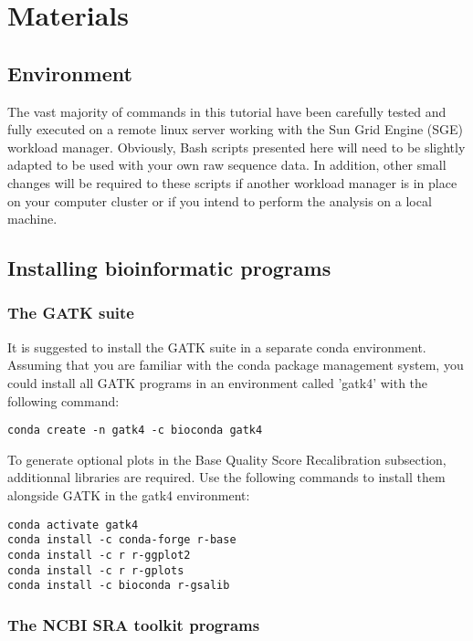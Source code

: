\section{Materials}

\subsection{Environment}


The vast majority of commands in this tutorial have been carefully tested and fully executed on a remote linux server working with the Sun Grid Engine (SGE) workload manager. Obviously, Bash scripts presented here will need to be slightly adapted to be used with your own raw sequence data. In addition, other small changes will be required  to these scripts if another workload manager is in place on your computer cluster or if you intend to perform the analysis on a local machine.





\subsection{Installing bioinformatic programs}

\subsubsection{The GATK suite}

It is suggested to install the GATK suite in a separate conda environment. Assuming that you are familiar with the conda package management system, you could install all GATK programs in an environment called 'gatk4' with the following command:

\begin{verbatim}
conda create -n gatk4 -c bioconda gatk4 
\end{verbatim}

To generate optional plots in the Base Quality Score Recalibration subsection, additionnal libraries are required. Use the following commands to install them alongside GATK in the gatk4 environment:

\begin{verbatim}
conda activate gatk4
conda install -c conda-forge r-base
conda install -c r r-ggplot2
conda install -c r r-gplots
conda install -c bioconda r-gsalib
\end{verbatim}


\subsubsection{The NCBI SRA toolkit programs}

